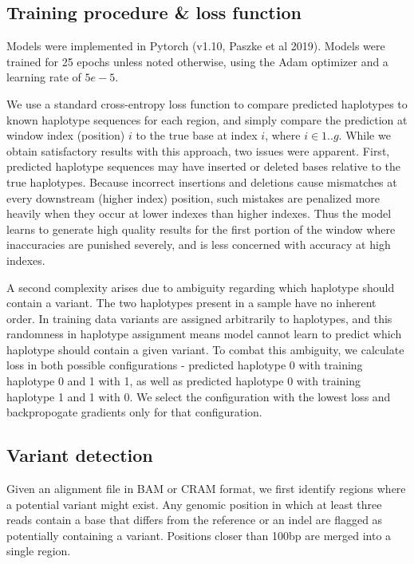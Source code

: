 \documentclass[]{article}
\begin{document}
\subsection{Training procedure \& loss function}

Models were implemented in Pytorch (v1.10, Paszke et al 2019). Models were trained for 25 epochs unless noted otherwise, using the Adam optimizer and a learning rate of $5e-5$. 

We use a standard cross-entropy loss function to compare predicted haplotypes to known haplotype sequences for each region, and simply compare the prediction at window index (position) $i$ to the true base at index $i$, where $i \in 1..g$.  While we obtain satisfactory results with this approach, two issues were apparent. First, predicted haplotype sequences may have inserted or deleted bases relative to the true haplotypes. Because incorrect insertions and deletions cause mismatches at every downstream (higher index) position, such mistakes are penalized more heavily when they occur at lower indexes than higher indexes. Thus the model learns to generate high quality results for the first portion of the window where inaccuracies are punished severely, and is less concerned with accuracy at high indexes. 

A second complexity arises due to ambiguity regarding which haplotype should contain a variant. The two haplotypes present in a sample have no inherent order. In training data variants are assigned arbitrarily to haplotypes, and this randomness in haplotype assignment means model cannot learn to predict which haplotype should contain a given variant. To combat this ambiguity, we calculate loss in both possible configurations - predicted haplotype 0 with training haplotype 0 and 1 with 1, as well as predicted haplotype 0 with training haplotype 1 and 1 with 0. We select the configuration with the lowest loss and backpropogate gradients only for that configuration. 


\subsection{Variant detection}

Given an alignment file in BAM or CRAM format, we first identify regions where a potential variant might exist. Any genomic position in which at least three reads contain a base that differs from the reference or an indel are flagged as potentially containing a variant. Positions closer than 100bp are merged into a single region. 
\end{document}
